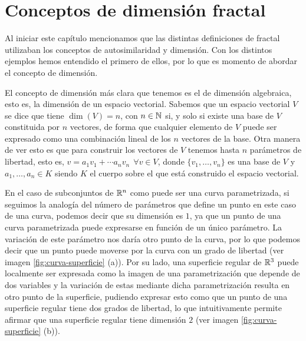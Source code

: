 \section{Conceptos de dimensión fractal}
\label{section:dimension}

Al iniciar este capítulo mencionamos que las distintas definiciones de fractal utilizaban los conceptos de autosimilaridad y dimensión. Con los distintos ejemplos hemos entendido el primero de ellos, por lo que es momento de abordar el concepto de dimensión. 

El concepto de dimensión más clara que tenemos es el de dimensión algebraica, esto es, la dimensión de un espacio vectorial. Sabemos que un espacio vectorial $V$ se dice que tiene $\dim(V)=n$, con $n\in\mathbb{N}$ si, y solo si existe una base de $V$ constituida por $n$ vectores, de forma que cualquier elemento de $V$ puede ser expresado como una combinación lineal de los $n$ vectores de la base. Otra manera de ver esto es que para construir los vectores de $V$ tenemos hasta $n$ parámetros de libertad, esto es, $v=a_1 v_1 +\cdots a_n v_n \ \ \forall v\in V$, donde $\{v_1,\dots,v_n\}$ es una base de $V$ y $a_1,\dots,a_n\in K$ siendo $K$ el cuerpo sobre el que está construido el espacio vectorial.

En el caso de subconjuntos de $\mathbb{R}^n$ como puede ser una curva parametrizada, si seguimos la analogía del número de parámetros que define un punto en este caso de una curva, podemos decir que su dimensión es $1$, ya que un punto de una curva parametrizada puede expresarse en función de un único parámetro. La variación de este parámetro nos daría otro punto de la curva, por lo que podemos decir que un punto puede moverse por la curva con un grado de libertad (ver imagen \ref{fig:curva-superficie} (a)). Por su lado, una superficie regular de $\mathbb{R}^3$ puede localmente ser expresada como la imagen de una parametrización que depende de dos variables y la variación de estas mediante dicha parametrización resulta en otro punto de la superficie, pudiendo expresar esto como que un punto de una superficie regular tiene dos grados de libertad, lo que intuitivamente permite afirmar que una superficie regular tiene dimensión $2$ (ver imagen \ref{fig:curva-superficie} (b)).

